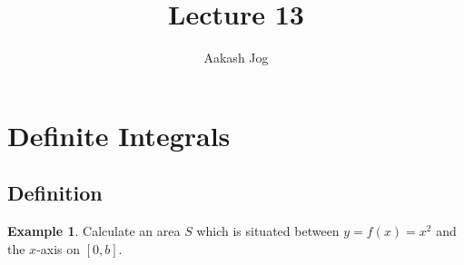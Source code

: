 \documentclass[fleqn, a4paper, 12pt]{article}
\title{Lecture 13}
\author{Aakash Jog}
\date{\formatdate{4}{12}{2014}}
\theoremstyle{definition}
\newtheorem{example}{Example}
\theoremstyle{theorem}
\theoremstyle{remark}
\begin{document}
	
\maketitle

\tableofcontents

\newpage

\section{Definite Integrals}

\subsection{Definition}

\begin{example}
	Calculate an area $S$ which is situated between $y = f(x) = x^2$ and the $x$-axis on $[0, b]$.
\end{example}
\end{document}
